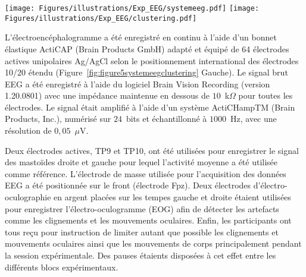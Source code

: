 \begin{figure*}[!t]
\centering
\texttt{[image: Figures/illustrations/Exp\_EEG/systemeeg.pdf]}
\texttt{[image: Figures/illustrations/Exp\_EEG/clustering.pdf]}
\caption[Système EEG, positionnement 10-20 et agrégation des électrodes]{
(Gauche) Référence du système de positionnement international 10-20 utilisé pour le placement des 64 électrodes. 
Deux électrodes d'électro-oculographie ont été placées sur la face externe des yeux gauche (lHEOG) et droit (rHEOG) afin de détecter les artefacts tels que les clignements et les mouvements oculaires. 
Deux électrodes actives, TP9 et TP10 (non figurées ici), ont été utilisées pour enregistrer le signal de la mastoïde gauche et droite. 
(Droite) Procédure d'agrégation des électrodes par moyennage arithmétique des valeurs d'intérêts utilisée dans l'étude II EEG. 
Cette procédure a été précédemment utilisée par \cite{grabner2012oscillatory} dans l'étude des corrélats neuronaux associés à l'apprentissage. 
Elle présente l'avantage de disposer de 8 aires corticales différentes ainsi que d'une aire sagittale et également d'avoir une latéralisation des aires cérébrales.}
\label{fig:figure5systemeegclustering}
\end{figure*}

L'électroencéphalogramme a été enregistré en continu à l'aide d'un bonnet élastique ActiCAP (Brain Products GmbH) adapté et équipé de 64 électrodes actives unipolaires Ag/AgCl selon le positionnement international des électrodes 10/20 étendu (Figure~\ref{fig:figure5systemeegclustering} Gauche). 
Le signal brut EEG a été enregistré à l'aide du logiciel Brain Vision Recording (version 1.20.0801) avec une impédance maintenue en dessous de $10$~k$\Omega$ pour toutes les électrodes. 
Le signal était amplifié à l'aide d'un système ActiCHampTM (Brain Products, Inc.), numérisé sur $24$~bits et échantillonné à $1000$~Hz, avec une résolution de $0,05$~$\mu$V.

Deux électrodes actives, TP9 et TP10, ont été utilisées pour enregistrer le signal des mastoïdes droite et gauche pour lequel l'activité moyenne a été utilisée comme référence. 
L'électrode de masse utilisée pour l'acquisition des données EEG a été positionnée sur le front (électrode Fpz). 
Deux électrodes d'électro-oculographie en argent placées sur les tempes gauche et droite étaient utilisées pour enregistrer l'électro-oculogramme (EOG) afin de détecter les artefacts comme les clignements et les mouvements oculaires. 
Enfin, les participants ont tous reçu pour instruction de limiter autant que possible les clignements et mouvements oculaires ainsi que les mouvements de corps principalement pendant la session expérimentale. 
Des pauses étaients disposées à cet effet entre les différents blocs expérimentaux. 

